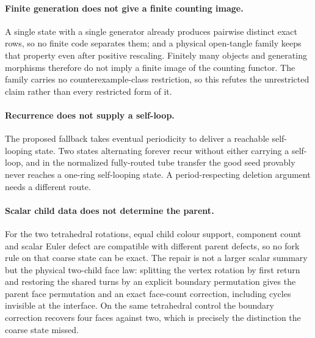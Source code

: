 \documentclass[11pt]{article}
\theoremstyle{definition}
\begin{document}
\paragraph{Finite generation does not give a finite counting image.}  A single
state with a single generator already produces pairwise distinct exact rows, so
no finite code separates them; and a physical open-tangle family keeps that
property even after positive rescaling.  Finitely many objects and generating
morphisms therefore do not imply a finite image of the counting functor.  The
family carries no counterexample-class restriction, so this refutes the
unrestricted claim rather than every restricted form of it.

\paragraph{Recurrence does not supply a self-loop.}  The proposed fallback
takes eventual periodicity to deliver a reachable self-looping state.  Two
states alternating forever recur without either carrying a self-loop, and in
the normalized fully-routed tube transfer the good seed provably never reaches
a one-ring self-looping state.  A period-respecting deletion argument needs a
different route.

\paragraph{Scalar child data does not determine the parent.}  For the two
tetrahedral rotations, equal child colour support, component count and scalar
Euler defect are compatible with different parent defects, so no fork rule on
that coarse state can be exact.  The repair is not a larger scalar summary but
the physical two-child face law: splitting the vertex rotation by first return
and restoring the shared turns by an explicit boundary permutation gives the
parent face permutation and an exact face-count correction, including cycles
invisible at the interface.  On the same tetrahedral control the boundary
correction recovers four faces against two, which is precisely the distinction
the coarse state missed.
\end{document}
